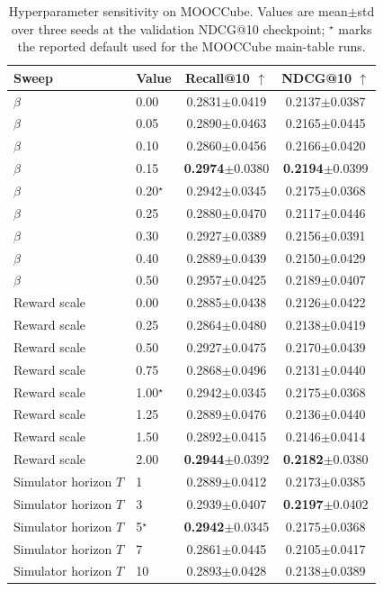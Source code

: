 \documentclass[letterpaper]{article}
\newcommand{\sd}[1]{{\footnotesize$\pm$#1}}
\newcommand{\tablecaptiongap}{\vspace{0.35em}}
\begin{document}
\begin{table}[t]
\centering
\caption{Hyperparameter sensitivity on MOOCCube. Values are mean\(\pm\)std over three seeds at the validation NDCG@10 checkpoint; \(^{\star}\) marks the reported default used for the MOOCCube main-table runs.}
\label{tab:supp-hparam}
\tablecaptiongap
\small
\begin{tabular*}{\textwidth}{@{\extracolsep{\fill}}llcc}
\toprule
Sweep & Value & Recall@10 \(\uparrow\) & NDCG@10 \(\uparrow\) \\
\midrule
\(\beta\) & 0.00 & 0.2831\sd{0.0419} & 0.2137\sd{0.0387} \\
\(\beta\) & 0.05 & 0.2890\sd{0.0463} & 0.2165\sd{0.0445} \\
\(\beta\) & 0.10 & 0.2860\sd{0.0456} & 0.2166\sd{0.0420} \\
\(\beta\) & 0.15 & \textbf{0.2974}\sd{0.0380} & \textbf{0.2194}\sd{0.0399} \\
\(\beta\) & 0.20\(^{\star}\) & 0.2942\sd{0.0345} & 0.2175\sd{0.0368} \\
\(\beta\) & 0.25 & 0.2880\sd{0.0470} & 0.2117\sd{0.0446} \\
\(\beta\) & 0.30 & 0.2927\sd{0.0389} & 0.2156\sd{0.0391} \\
\(\beta\) & 0.40 & 0.2889\sd{0.0439} & 0.2150\sd{0.0429} \\
\(\beta\) & 0.50 & 0.2957\sd{0.0425} & 0.2189\sd{0.0407} \\
\midrule
Reward scale & 0.00 & 0.2885\sd{0.0438} & 0.2126\sd{0.0422} \\
Reward scale & 0.25 & 0.2864\sd{0.0480} & 0.2138\sd{0.0419} \\
Reward scale & 0.50 & 0.2927\sd{0.0475} & 0.2170\sd{0.0439} \\
Reward scale & 0.75 & 0.2868\sd{0.0496} & 0.2131\sd{0.0440} \\
Reward scale & 1.00\(^{\star}\) & 0.2942\sd{0.0345} & 0.2175\sd{0.0368} \\
Reward scale & 1.25 & 0.2889\sd{0.0476} & 0.2136\sd{0.0440} \\
Reward scale & 1.50 & 0.2892\sd{0.0415} & 0.2146\sd{0.0414} \\
Reward scale & 2.00 & \textbf{0.2944}\sd{0.0392} & \textbf{0.2182}\sd{0.0380} \\
\midrule
Simulator horizon \(T\) & 1 & 0.2889\sd{0.0412} & 0.2173\sd{0.0385} \\
Simulator horizon \(T\) & 3 & 0.2939\sd{0.0407} & \textbf{0.2197}\sd{0.0402} \\
Simulator horizon \(T\) & 5\(^{\star}\) & \textbf{0.2942}\sd{0.0345} & 0.2175\sd{0.0368} \\
Simulator horizon \(T\) & 7 & 0.2861\sd{0.0445} & 0.2105\sd{0.0417} \\
Simulator horizon \(T\) & 10 & 0.2893\sd{0.0428} & 0.2138\sd{0.0389} \\
\bottomrule
\end{tabular*}
\end{table}
\end{document}
